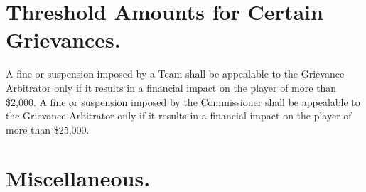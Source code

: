 \documentclass[
]{book}
\begin{document}
\hypertarget{threshold-amounts-for-certain-grievances.}{%
\section{Threshold Amounts for Certain Grievances.}\label{threshold-amounts-for-certain-grievances.}}

A fine or suspension imposed by a Team shall be appealable to the Grievance Arbitrator only if it results in a financial impact on the player of more than \$2,000. A fine or suspension imposed by the Commissioner shall be appealable to the Grievance Arbitrator only if it results in a financial impact on the player of more than \$25,000.

\hypertarget{miscellaneous.-1}{%
\section{Miscellaneous.}\label{miscellaneous.-1}}
\end{document}
